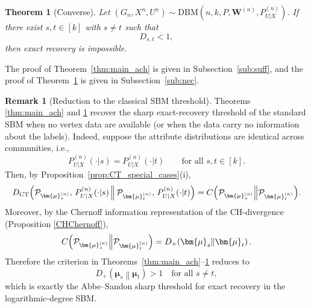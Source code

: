 \documentclass[11pt]{article}
\theoremstyle{plain}
\newtheorem{theorem}{Theorem}[section]
\theoremstyle{definition}
\newtheorem*{remark}{Remark}
\begin{document}
\begin{theorem}[Converse]\label{thm:main_conv}
Let $(G_n,X^n,U^n)\sim \mathrm{DBM}\!\left(n,k,P,\mathbf{W}^{(n)},P^{(n)}_{U|X}\right)$.
If there exist $s,t\in[k]$ with $s\neq t$ such that
\begin{equation}
D_{s,t}<1,
\label{eq:conv_condition}
\end{equation}
then exact recovery is impossible.
\end{theorem}
The proof of Theorem~\ref{thm:main_ach} is given in Subsection~\ref{sub:suff},
and the proof of Theorem~\ref{thm:main_conv} is given in Subsection~\ref{sub:nec}.
\begin{remark}[Reduction to the classical SBM threshold]\label{rem:reduction_to_SBM}
Theorems \ref{thm:main_ach} and \ref{thm:main_conv} recover the sharp exact-recovery threshold of the standard SBM when no vertex data are available (or when the data carry no information about the labels).
Indeed, suppose the attribute distributions are identical across communities, i.e.,
\[
P^{(n)}_{U|X}(\cdot|s)=P^{(n)}_{U|X}(\cdot|t)\qquad \text{for all } s,t\in[k].
\]
Then, by Proposition~\ref{prop:CT_special_cases}(i),
\[
D_{\mathrm{CT}}\Bigl(\mathcal{P}_{\bm{\mu}_s^{(n)}},\,P^{(n)}_{U|X}(\cdot|s)\,\Big\|\,\mathcal{P}_{\bm{\mu}_t^{(n)}},\,P^{(n)}_{U|X}(\cdot|t)\Bigr)
=
C\Bigl(\mathcal{P}_{\bm{\mu}_s^{(n)}}\Big\| \mathcal{P}_{\bm{\mu}_t^{(n)}}\Bigr).
\]
Moreover, by the Chernoff information representation of the CH-divergence (Proposition \ref{CHChernoff}),
\[
C\Bigl(\mathcal{P}_{\bm{\mu}_s^{(n)}}\Big\| \mathcal{P}_{\bm{\mu}_t^{(n)}}\Bigr)
=
D_+\!\left(\bm{\mu}_s\middle\|\bm{\mu}_t\right).
\]
Therefore the criterion in Theorems~\ref{thm:main_ach}--\ref{thm:main_conv} reduces to
\[
D_+\!\left(\bm{\mu}_s\middle\|\bm{\mu}_t\right) > 1 \quad \text{for all } s\neq t,
\]
which is exactly the Abbe--Sandon sharp threshold for exact recovery in the logarithmic-degree SBM.
\end{remark}
\end{document}
